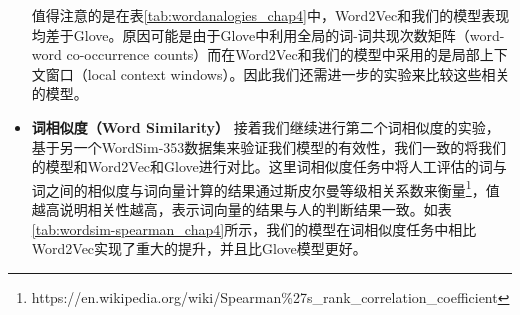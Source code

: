 \documentclass[master]{njuthesis}
\begin{document}
\begin{itemize}
值得注意的是在表\ref{tab:wordanalogies_chap4}中，Word2Vec和我们的模型表现均差于Glove。原因可能是由于Glove中利用全局的词-词共现次数矩阵（word-word co-occurrence counts）而在Word2Vec和我们的模型中采用的是局部上下文窗口（local context windows）。因此我们还需进一步的实验来比较这些相关的模型。

\item \textbf{词相似度（Word Similarity）} 接着我们继续进行第二个词相似度的实验，基于另一个WordSim-353数据集来验证我们模型的有效性，我们一致的将我们的模型和Word2Vec和Glove进行对比。这里词相似度任务中将人工评估的词与词之间的相似度与词向量计算的结果通过斯皮尔曼等级相关系数来衡量\footnote{https://en.wikipedia.org/wiki/Spearman\%27s\_rank\_correlation\_coefficient}，值越高说明相关性越高，表示词向量的结果与人的判断结果一致。如表\ref{tab:wordsim-spearman_chap4}所示，我们的模型在词相似度任务中相比Word2Vec实现了重大的提升，并且比Glove模型更好。


\end{itemize}
\end{document}
